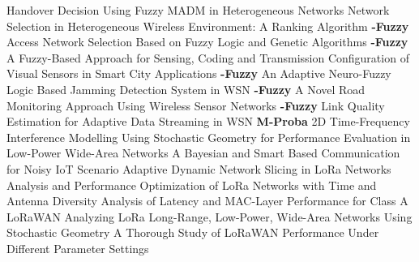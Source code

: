  \cite{wenhui_zhang_handover_2004} Handover Decision Using Fuzzy {{MADM}} in Heterogeneous Networks \newline 
 \cite{dhar_network_2007} Network {{Selection}} in {{Heterogeneous Wireless Environment}}: {{A Ranking Algorithm}} \newline 
\textbf{-Fuzzy} \newline  \cite{alkhawlani_access_2008} Access {{Network Selection Based}} on {{Fuzzy Logic}} and {{Genetic Algorithms}} \newline 
\textbf{-Fuzzy} \newline  \cite{costa_fuzzy-based_2017} A {{Fuzzy}}-{{Based Approach}} for {{Sensing}}, {{Coding}} and {{Transmission Configuration}} of {{Visual Sensors}} in {{Smart City Applications}} \newline 
\textbf{-Fuzzy} \newline  \cite{vijayakumar_adaptive_2019} An Adaptive Neuro-Fuzzy Logic Based Jamming Detection System in {{WSN}} \newline 
\textbf{-Fuzzy} \newline  \cite{collotta_novel_2012} A {{Novel Road Monitoring Approach Using Wireless Sensor Networks}} \newline 
\textbf{-Fuzzy} \newline  \cite{jayasri_link_2017} Link {{Quality Estimation}} for {{Adaptive Data Streaming}} in {{WSN}} \newline 
\textbf{M-Proba} \newline  \cite{li_2d_2016} {{2D}} Time-Frequency Interference Modelling Using Stochastic Geometry for Performance Evaluation in {{Low}}-{{Power Wide}}-{{Area Networks}} \newline 
 \cite{razafimandimby_bayesian_2017} A {{Bayesian}} and Smart  Based Communication for Noisy {{IoT}} Scenario \newline 
 \cite{dawaliby_adaptive_2019} Adaptive Dynamic Network Slicing in {{LoRa}} Networks \newline 
 \cite{hoeller_analysis_2018} Analysis and Performance Optimization of {{LoRa}} Networks with Time and Antenna Diversity \newline 
 \cite{sorensen_analysis_2017} Analysis of {{Latency}} and {{MAC}}-{{Layer Performance}} for {{Class A LoRaWAN}} \newline 
 \cite{blaszczyszyn_analyzing_2019} Analyzing {{LoRa}} Long-Range, Low-Power, Wide-Area Networks Using Stochastic Geometry \newline 
 \cite{magrin_thorough_2019} A {{Thorough Study}} of {{LoRaWAN Performance Under Different Parameter Settings}} \newline 
